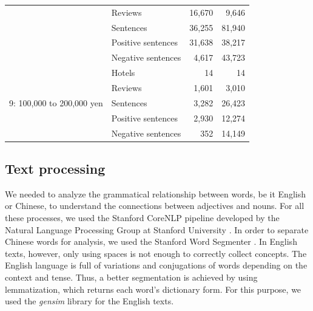 \documentclass[smallextended,natbib]{svjour3}       %
\begin{document}
\begin{table}[ht]
{\begin{tabular}{|l|l|r|r|}
                                                   & Reviews            & 16,670  & 9,646   \\
                                                   & Sentences          & 36,255  & 81,940  \\
                                                   & Positive sentences & 31,638  & 38,217  \\
                                                   & Negative sentences & 4,617   & 43,723  \\ \hline
        \multirow{5}{*}{9: 100,000 to 200,000 yen}   & Hotels             & 14      & 14      \\
                                                   & Reviews            & 1,601   & 3,010   \\
                                                   & Sentences          & 3,282   & 26,423  \\
                                                   & Positive sentences & 2,930   & 12,274  \\
                                                   & Negative sentences & 352     & 14,149  \\ \hline
        \end{tabular}%
      }
    \end{table}
  \subsection{Text processing}\label{textprocessing}

    We needed to analyze the grammatical relationship between words, be it English or Chinese, to understand the connections between adjectives and nouns. For all these processes, we used the Stanford CoreNLP pipeline developed by the Natural Language Processing Group at Stanford University \cite[][]{manning-EtAl:2014:P14-5}. In order to separate Chinese words for analysis, we used the Stanford Word Segmenter \cite[][]{chang2008}. In English texts, however, only using spaces is not enough to correctly collect concepts. The English language is full of variations and conjugations of words depending on the context and tense. Thus, a better segmentation is achieved by using lemmatization, which returns each word's dictionary form. For this purpose, we used the \textit{gensim} library for the English texts.
\end{document}
